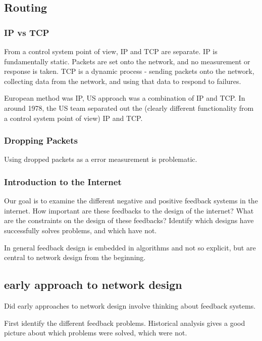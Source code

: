 \subsection{Routing}

\subsubsection{IP vs TCP}

From a control system point of view, IP and TCP are separate. IP is fundamentally static. Packets
are set onto the network, and no measurement or response is taken. TCP is a dynamic process -
sending packets onto the network, collecting data from the network, and using that data to respond
to failures.

European method was IP, US approach was a combination of IP and TCP. In around 1978, the US team
separated out the (clearly different functionality from a control system point of view) IP and TCP.

\subsubsection{Dropping Packets}

Using dropped packets as a error measurement is problematic.

\subsubsection{Introduction to the Internet}

Our goal is to examine the different negative and positive feedback systems in the internet. How
important are these feedbacks to the design of the internet? What are the constraints on the design
of these feedbacks? Identify which designs have successfully solves problems, and which have not.

In general feedback design is embedded in algorithms and not so explicit, but are central to network
design from the beginning. 

\subsection{early approach to network design}

Did early approaches to network design involve thinking about feedback systems.

First identify the different feedback problems. Historical analysis gives a good picture about which
problems were solved, which were not.



